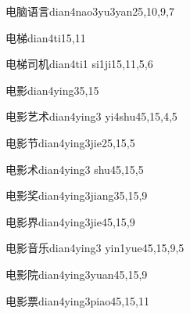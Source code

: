 \begin{verbete}{电脑语言}{dian4nao3yu3yan2}{5,10,9,7}
\end{verbete}

\begin{verbete}{电梯}{dian4ti1}{5,11}
\end{verbete}

\begin{verbete}{电梯司机}{dian4ti1 si1ji1}{5,11,5,6}
\end{verbete}

\begin{verbete}{电影}{dian4ying3}{5,15}
\end{verbete}

\begin{verbete}{电影艺术}{dian4ying3 yi4shu4}{5,15,4,5}
\end{verbete}

\begin{verbete}{电影节}{dian4ying3jie2}{5,15,5}
\end{verbete}

\begin{verbete}{电影术}{dian4ying3 shu4}{5,15,5}
\end{verbete}

\begin{verbete}{电影奖}{dian4ying3jiang3}{5,15,9}
\end{verbete}

\begin{verbete}{电影界}{dian4ying3jie4}{5,15,9}
\end{verbete}

\begin{verbete}{电影音乐}{dian4ying3 yin1yue4}{5,15,9,5}
\end{verbete}

\begin{verbete}{电影院}{dian4ying3yuan4}{5,15,9}
\end{verbete}

\begin{verbete}{电影票}{dian4ying3piao4}{5,15,11}
\end{verbete}

